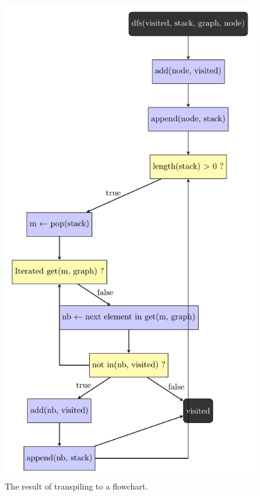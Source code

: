 \begin{figure}[ht!]
    \centering
    \includegraphics[scale=.6]{assets/chapter6/graph/DFS_ibp.pdf}
    \caption{The result of transpiling  to a flowchart.}
    \label{dfsIBP}
\end{figure}
